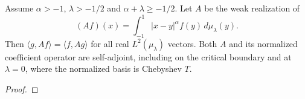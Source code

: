 \begin{theorem}
\label{thm:power-law-self-adjoint}
\leanok
Assume $\alpha>-1$, $\lambda>-1/2$ and $\alpha+\lambda\ge-1/2$.
Let $A$ be the weak realization of
\[
 (Af)(x)=\int_{-1}^1 |x-y|^\alpha f(y)\,d\mu_\lambda(y).
\]
Then $\langle g,Af\rangle=\langle f,Ag\rangle$ for all real
$L^2(\mu_\lambda)$ vectors. Both $A$ and its normalized coefficient
operator are self-adjoint, including on the critical boundary and at
$\lambda=0$, where the normalized basis is Chebyshev $T$.
\end{theorem}
\begin{proof}
\leanok
\end{proof}

